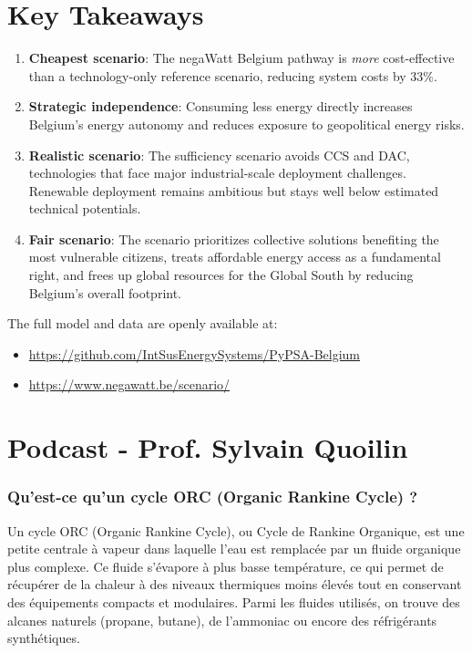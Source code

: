 \section{Key Takeaways}

\begin{enumerate}
    \item \textbf{Cheapest scenario}: The negaWatt Belgium pathway is
          \emph{more} cost-effective than a technology-only reference scenario,
          reducing system costs by 33\%.
    \item \textbf{Strategic independence}: Consuming less energy directly
          increases Belgium's energy autonomy and reduces exposure to
          geopolitical energy risks.
    \item \textbf{Realistic scenario}: The sufficiency scenario avoids CCS
          and DAC, technologies that face major industrial-scale deployment
          challenges. Renewable deployment remains ambitious but stays well
          below estimated technical potentials.
    \item \textbf{Fair scenario}: The scenario prioritizes collective solutions
          benefiting the most vulnerable citizens, treats affordable energy
          access as a fundamental right, and frees up global resources for
          the Global South by reducing Belgium's overall footprint.
\end{enumerate}

The full model and data are openly available at:
\begin{itemize}[noitemsep]
    \item \url{https://github.com/IntSusEnergySystems/PyPSA-Belgium}
    \item \url{https://www.negawatt.be/scenario/}
\end{itemize}


\section{Podcast - Prof. Sylvain Quoilin}

\subsubsection{Qu'est-ce qu'un cycle ORC (Organic Rankine Cycle) ?}

Un cycle ORC (Organic Rankine Cycle), ou Cycle de Rankine Organique, est une petite centrale à vapeur dans laquelle l'eau est remplacée par un fluide organique plus complexe. Ce fluide s'évapore à plus basse température, ce qui permet de récupérer de la chaleur à des niveaux thermiques moins élevés tout en conservant des équipements compacts et modulaires. Parmi les fluides utilisés, on trouve des alcanes naturels (propane, butane), de l'ammoniac ou encore des réfrigérants synthétiques.


